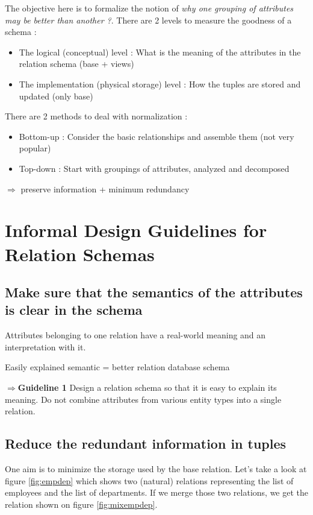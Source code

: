 The objective here is to formalize the notion of \textit{why one grouping of attributes may be better than another ?}. There are 2 levels to measure the goodness of a schema :
\begin{itemize}
    \item The logical (conceptual) level : What is the meaning of the attributes in the relation schema (base + views)
    \item The implementation (physical storage) level : How the tuples are stored and updated (only base)
\end{itemize}

There are 2 methods to deal with normalization :
\begin{itemize}
    \item Bottom-up : Consider the basic relationships and assemble them (not very popular)
    \item Top-down : Start with groupings of attributes, analyzed and decomposed
\end{itemize}
$\Rightarrow$ preserve information + minimum redundancy

\section{Informal Design Guidelines for Relation Schemas}
\subsection{Make sure that the semantics of the attributes is clear in the schema}
Attributes belonging to one relation have a real-world meaning and an interpretation with it.
\begin{center}
Easily explained semantic = better relation database schema
\end{center}

$\Rightarrow$\textbf{Guideline 1 } Design a relation schema so that it is easy to explain its meaning. Do not  combine attributes from various entity types into a single relation.


\subsection{Reduce the redundant information in tuples}
One aim is to minimize the storage used by the base relation. Let's take a look at figure \ref{fig:empdep} which shows two (natural) relations representing the list of employees and the list of departments. If we merge those two relations, we get the relation shown on figure \ref{fig:mixempdep}.\\

